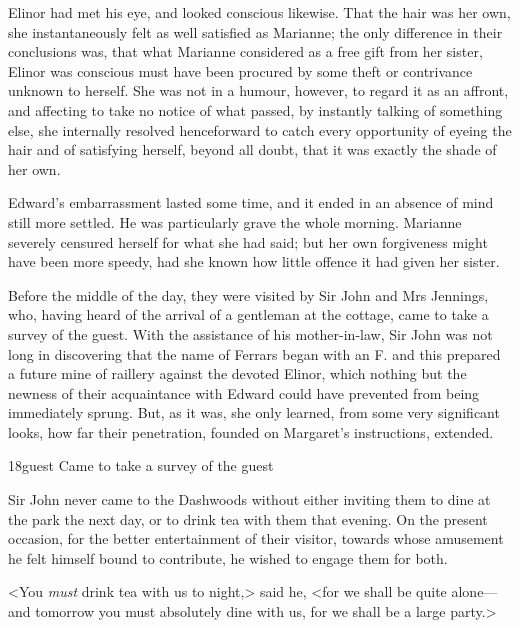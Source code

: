 Elinor had met his eye, and looked conscious likewise. That the hair was her own, she instantaneously felt as well satisfied as Marianne; the only difference in their conclusions was, that what Marianne considered as a free gift from her sister, Elinor was conscious must have been procured by some theft or contrivance unknown to herself. She was not in a humour, however, to regard it as an affront, and affecting to take no notice of what passed, by instantly talking of something else, she internally resolved henceforward to catch every opportunity of eyeing the hair and of satisfying herself, beyond all doubt, that it was exactly the shade of her own.

Edward's embarrassment lasted some time, and it ended in an absence of mind still more settled. He was particularly grave the whole morning. Marianne severely censured herself for what she had said; but her own forgiveness might have been more speedy, had she known how little offence it had given her sister.

Before the middle of the day, they were visited by Sir John and Mrs Jennings, who, having heard of the arrival of a gentleman at the cottage, came to take a survey of the guest. With the assistance of his mother-in-law, Sir John was not long in discovering that the name of Ferrars began with an F. and this prepared a future mine of raillery against the devoted Elinor, which nothing but the newness of their acquaintance with Edward could have prevented from being immediately sprung. But, as it was, she only learned, from some very significant looks, how far their penetration, founded on Margaret's instructions, extended.


\begin{bwbigpic}
	[1.0]
	{18guest} 
	{Came to take a survey of the guest} 
\end{bwbigpic}

Sir John never came to the Dashwoods without either inviting them to dine at the park the next day, or to drink tea with them that evening. On the present occasion, for the better entertainment of their visitor, towards whose amusement he felt himself bound to contribute, he wished to engage them for both.

<You \textit{must} drink tea with us to night,> said he, <for we shall be quite alone—and tomorrow you must absolutely dine with us, for we shall be a large party.>

